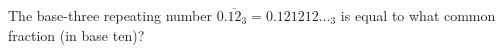 The base-three repeating number $0.\overline{12}_3=0.121212\ldots_3$ is equal to what common fraction (in base ten)?
